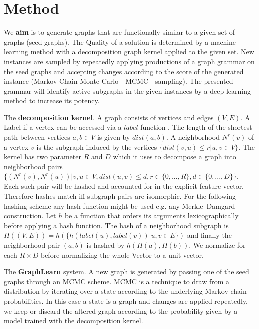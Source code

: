 \documentclass{article}
\begin{document}
\section{Method}

We \textbf{ aim }is to generate graphs that are functionally similar to a given set of graphs (seed graphs).
The Quality of a solution is determined by a machine learning method with a decomposition graph 
kernel applied to the given set. New instances are sampled by repeatedly applying productions
of a graph grammar on the seed graphs and accepting changes according to the score of the generated
instance (Markov Chain Monte Carlo - MCMC - sampling). The presented grammar will identify
active subgraphs in the given instances by a deep learning method to increase its potency. 
 
The \textbf{decomposition kernel}. A graph consists of vertices and edges $(V,E)$. 
A Label if a vertex can be accessed via a $label$ function .
The length of the shortest path between vertices $a,b \in V$ is given by $dist(a,b)$.
A neighborhood $N^r(v)$ of a
vertex $v$ is the subgraph induced by the vertices $\{dist(v,u) \leq r | u,v \in V \}$.
The kernel has two parameter $R$ and $D$ which it uses to decompose a graph into neighborhood pairs
$\{ (N^r(v), N^r(u)) | v,u \in V , dist(u,v) \leq d, r \in \{0,...,R\}, d\in \{0,...,D\}  \}$. 
Each such pair will be hashed and accounted for in the explicit feature vector.
Therefore  hashes match iff subgraph pairs are isomorphic.
For the following hashing scheme any hash function might be used e.g. any Merkle--Damgard construction.
Let $h$ be a function that orders its arguments lexicographically before applying a hash function. 
The hash of a neighborhood subgraph is $H((V,E)) = h(\{ h(label(u), label(v)) | u,v \in E \})$
and finally the neighborhood pair $(a,b)$ is hashed by $h(H(a),H(b))$.
We normalize for each $R \times D$ before normalizing the whole Vector to a unit vector.

The \textbf{GraphLearn} system. A new graph is generated by passing one of the seed graphs
through an MCMC scheme. MCMC is a technique to draw from a distribution by iterating over 
a state according to the underlying Markov chain probabilities. In this case a state is a 
graph and changes are applied repeatedly, we keep or discard the altered graph according
to the probability given by a model trained with the decomposition kernel. 
\end{document}
